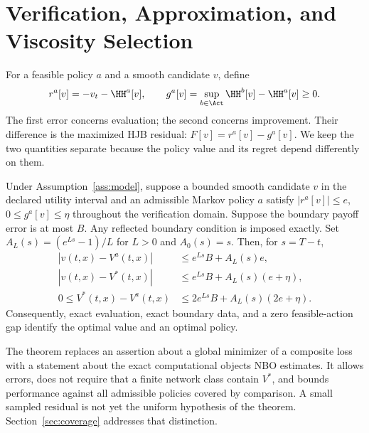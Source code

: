 \section{Verification, Approximation, and Viscosity Selection}\label{sec:theory}
For a feasible policy $a$ and a smooth candidate $v$, define
\begin{equation}\label{eq:errors}
 r^a[v]=-v_t-\HH^a[v],\qquad
 g^a[v]=\sup_{b\in\Act}\HH^b[v]-\HH^a[v]\geq0.
\end{equation}
The first error concerns evaluation; the second concerns improvement. Their difference is the maximized HJB residual: $F[v]=r^a[v]-g^a[v]$. We keep the two quantities separate because the policy value and its regret depend differently on them.

\begin{theorem}\label{thm:verification}
Under Assumption~\ref{ass:model}, suppose a bounded smooth candidate $v$ in the declared utility interval and an admissible Markov policy $a$ satisfy $|r^a[v]|\leq e$, $0\leq g^a[v]\leq\eta$ throughout the verification domain. Suppose the boundary payoff error is at most $B$. Any reflected boundary condition is imposed exactly. Set $A_L(s)=(e^{Ls}-1)/L$ for $L>0$ and $A_0(s)=s$. Then, for $s=T-t$,
\begin{align}
 |v(t,x)-V^a(t,x)|&\leq e^{Ls}B+A_L(s)e,\label{eq:policybound}\\
 |v(t,x)-V^*(t,x)|&\leq e^{Ls}B+A_L(s)(e+\eta),\label{eq:valuebound}\\
 0\leq V^*(t,x)-V^a(t,x)&\leq2e^{Ls}B+A_L(s)(2e+\eta).\label{eq:regret}
\end{align}
Consequently, exact evaluation, exact boundary data, and a zero feasible-action gap identify the optimal value and an optimal policy.
\end{theorem}

The theorem replaces an assertion about a global minimizer of a composite loss with a statement about the exact computational objects NBO estimates. It allows errors, does not require that a finite network class contain $V^*$, and bounds performance against all admissible policies covered by comparison. A small sampled residual is not yet the uniform hypothesis of the theorem. Section~\ref{sec:coverage} addresses that distinction.

